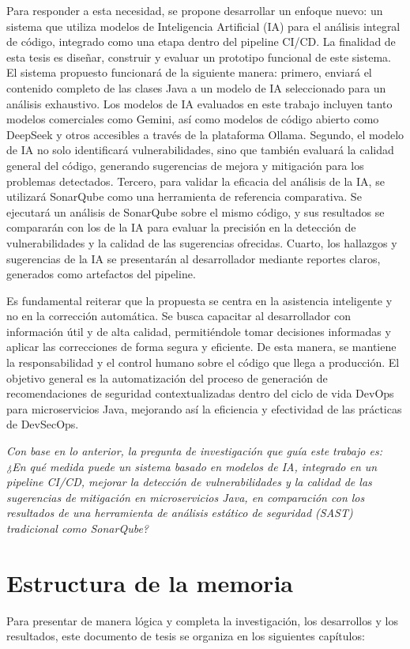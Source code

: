 Para responder a esta necesidad, se propone desarrollar un enfoque nuevo: un sistema que utiliza modelos de Inteligencia Artificial (IA) para el análisis integral de código, integrado como una etapa dentro del pipeline CI/CD. La finalidad de esta tesis es diseñar, construir y evaluar un prototipo funcional de este sistema. El sistema propuesto funcionará de la siguiente manera: primero, enviará el contenido completo de las clases Java a un modelo de IA seleccionado para un análisis exhaustivo. Los modelos de IA evaluados en este trabajo incluyen tanto modelos comerciales como Gemini, así como modelos de código abierto como DeepSeek y otros accesibles a través de la plataforma Ollama. Segundo, el modelo de IA no solo identificará vulnerabilidades, sino que también evaluará la calidad general del código, generando sugerencias de mejora y mitigación para los problemas detectados. Tercero, para validar la eficacia del análisis de la IA, se utilizará SonarQube como una herramienta de referencia comparativa. Se ejecutará un análisis de SonarQube sobre el mismo código, y sus resultados se compararán con los de la IA para evaluar la precisión en la detección de vulnerabilidades y la calidad de las sugerencias ofrecidas. Cuarto, los hallazgos y sugerencias de la IA se presentarán al desarrollador mediante reportes claros, generados como artefactos del pipeline.

Es fundamental reiterar que la propuesta se centra en la asistencia inteligente y no en la corrección automática. Se busca capacitar al desarrollador con información útil y de alta calidad, permitiéndole tomar decisiones informadas y aplicar las correcciones de forma segura y eficiente. De esta manera, se mantiene la responsabilidad y el control humano sobre el código que llega a producción. El objetivo general es la automatización del proceso de generación de recomendaciones de seguridad contextualizadas dentro del ciclo de vida DevOps para microservicios Java, mejorando así la eficiencia y efectividad de las prácticas de DevSecOps.

\textit{Con base en lo anterior, la pregunta de investigación que guía este trabajo es: ¿En qué medida puede un sistema basado en modelos de IA, integrado en un pipeline CI/CD, mejorar la detección de vulnerabilidades y la calidad de las sugerencias de mitigación en microservicios Java, en comparación con los resultados de una herramienta de análisis estático de seguridad (SAST) tradicional como SonarQube?}

\section{Estructura de la memoria}\label{sec:estructura}
Para presentar de manera lógica y completa la investigación, los desarrollos y los resultados, este documento de tesis se organiza en los siguientes capítulos:

